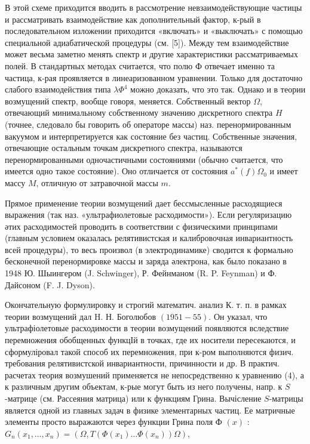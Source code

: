 \documentclass[10pt]{article}
\begin{document}
В этой схеме приходится вводить в рассмотрение невзаимодействующие частицы и рассматривать взаимодействие как дополнительный фактор, к-рый в последовательном изложении приходится «включать» и «выключать» с помощью специальной адиабатической процедуры (см. [5]). Между тем взаимодействие может весьма заметно менять спектр и другие характеристики рассматриваемых полей. В стандартных методах считается, что полю Ф отвечает именно та частица, к-рая проявляется в линеаризованном уравнении. Только для достаточно слабого взаимодействия типа $\lambda \Phi^{4}$ можно доказать, что это так. Однако и в теории возмущений спектр, вообще говоря, меняется. Собственный вектор $\Omega$, отвечающий минимальному собственному значению дискретного спектра $H$ (точнее, следовало бы говорить об операторе массы) наз. перенормированным вакуумом и интерпретируется как состояние без частиц. Собственные значения, отвечающие остальным точкам дискретного спектра, называются перенормированными одночастичными состояниями (обычно считается, что имеется одно такое состояние). Оно отличается от состояния $a^{*}(f) \Omega_{0}$ и имеет массу $M$, отличную от затравочной массы $m$.



Прямое применение теории возмущений дает бессмысленные расходящиеся выражения (так наз. «ультрафиолетовые расходимости»). Если регуляризацию әтих расходимостей проводить в соответствии с физическими принципами (главным условием оказалась релятивистская и калибровочная инвариантность всей процедуры), то весь произвол (в электродинамике) сводится к формально бесконечной перенормировке массы и заряда әлектрона, как было показано в 1948 Ю. Шыингером (J. Schwinger), Р. Фейнманом (R. P. Feynman) и Ф. Дайсоном (F. J. Dyson).



Окончательную формулировку и строгий математич. анализ К. т. п. в рамках теории возмущений дал H. Н. Боголюбов $(1951-55)$. Он указал, что ультрафіолетовые расходимости в теории возмущений появляются вследствие перемножения обобщенных функцІй в точках, где их носители пересекаются, и сформуліровал такой способ их перемножения, при к-ром выполняются физич. требования релятивистской инвариантности, причинности и др. В практич. расчетах теория возмушений применяется не непосредственно к уравнению (4), а к различным другим объектам, к-рые могут быть из него получены, напр. к $S$-матрице (см. Рассеяния матрица) или к функциям Грина. Вычісление $S$-матрицы является одной из главных задач в физике элементарных частиц. Ее матричные элементы просто выражаются через функции Грина поля Ф $(x)$ : $G_{n}\left(x_{1}, \ldots, x_{n}\right)=\left(\Omega, T\left(\Phi\left(x_{1}\right) \ldots \Phi\left(x_{n}\right)\right) \Omega\right)$,
\end{document}
